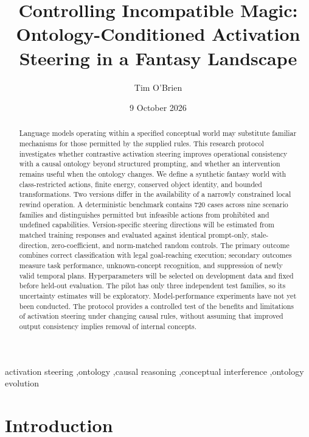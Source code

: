 \documentclass[preprint,12pt,numbers,nopreprintline]{elsarticle}
\date{9 October 2026}
\begin{document}
\begin{frontmatter}
\title{Controlling Incompatible Magic: Ontology-Conditioned Activation Steering in a Fantasy Landscape}
\author{Tim O'Brien}
\begin{abstract}
Language models operating within a specified conceptual world may substitute familiar mechanisms for those permitted by the supplied rules. This research protocol investigates whether contrastive activation steering improves operational consistency with a causal ontology beyond structured prompting, and whether an intervention remains useful when the ontology changes. We define a synthetic fantasy world with class-restricted actions, finite energy, conserved object identity, and bounded transformations. Two versions differ in the availability of a narrowly constrained local rewind operation. A deterministic benchmark contains 720 cases across nine scenario families and distinguishes permitted but infeasible actions from prohibited and undefined capabilities. Version-specific steering directions will be estimated from matched training responses and evaluated against identical prompt-only, stale-direction, zero-coefficient, and norm-matched random controls. The primary outcome combines correct classification with legal goal-reaching execution; secondary outcomes measure task performance, unknown-concept recognition, and suppression of newly valid temporal plans. Hyperparameters will be selected on development data and fixed before held-out evaluation. The pilot has only three independent test families, so its uncertainty estimates will be exploratory. Model-performance experiments have not yet been conducted. The protocol provides a controlled test of the benefits and limitations of activation steering under changing causal rules, without assuming that improved output consistency implies removal of internal concepts.
\end{abstract}
\begin{keyword}
activation steering \sep ontology \sep causal reasoning \sep conceptual interference \sep ontology evolution
\end{keyword}
\end{frontmatter}
\thispagestyle{plain}

\section{Introduction}
\end{document}
